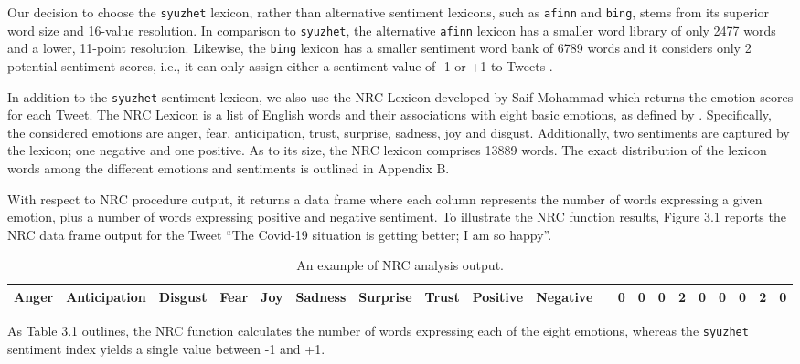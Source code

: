 Our decision to choose the \texttt{syuzhet} lexicon, rather than alternative sentiment lexicons, such as \texttt{afinn} and \texttt{bing}, stems from its superior word size and 16-value resolution. In comparison to \texttt{syuzhet}, the alternative \texttt{afinn} lexicon has a smaller word library of only 2477 words and a lower, 11-point resolution. Likewise, the \texttt{bing} lexicon has a smaller sentiment word bank of 6789 words and it considers only 2 potential sentiment scores, i.e., it can only assign either a sentiment value of -1 or +1 to Tweets \parencite{naldi2019review}. 

In addition to the \texttt{syuzhet} sentiment lexicon, we also use the NRC Lexicon developed by Saif Mohammad \parencite{mohammad2013nrc} which returns the emotion scores for each Tweet. The NRC Lexicon is a list of English words and their associations with eight basic emotions, as defined by \textcite{plutchik1982psychoevolutionary}. Specifically, the considered emotions are anger, fear, anticipation, trust, surprise, sadness, joy and disgust. Additionally, two sentiments are captured by the lexicon; one negative and one positive. As to its size, the NRC lexicon comprises 13889 words. The exact distribution of the lexicon words among the different emotions and sentiments is outlined in Appendix B.

With respect to NRC procedure output, it returns a data frame where each column represents the number of words expressing a given emotion, plus a number of words expressing positive and negative sentiment. To illustrate the NRC function results, Figure 3.1 reports the NRC data frame output for the Tweet “The Covid-19 situation is getting better; I am so happy”.

\begin{table}[h]
\centering
\caption{An example of NRC analysis output.}
\vspace{0.5cm}
\begin{tabular}{llllllllll}
\hline\hline
Anger & Anticipation & Disgust & Fear & Joy & Sadness & Surprise & Trust & Positive & Negative \ 
 & 0 & 0 & 0 & 2 & 0 & 0 & 0 & 2 & 0 \\
\hline
\end{tabular}
\end{table}

As Table 3.1 outlines, the NRC function calculates the number of words expressing each of the eight emotions, whereas the \texttt{syuzhet} sentiment index yields a single value between -1 and +1. 

